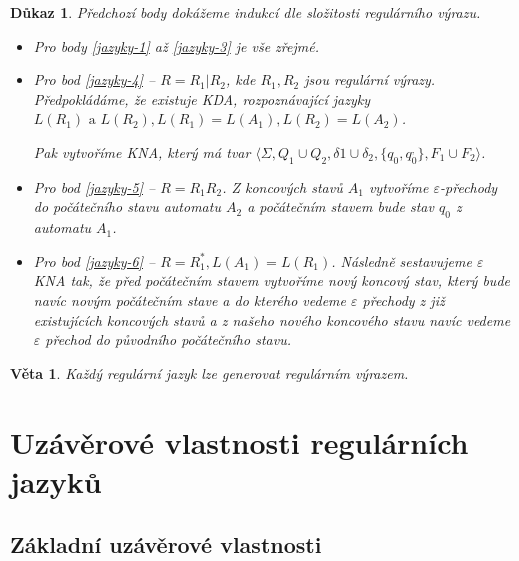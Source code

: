 \documentclass[10pt, a4paper, titlepage]{article}
\theoremstyle{note}
\newtheorem{veta}{\textbf{Věta}}
\newtheorem{dukaz}{\textbf{Důkaz}}
\begin{document}
\begin{dukaz}
Předchozí body dokážeme indukcí dle složitosti regulárního výrazu.

\begin{itemize}
\item
Pro body \ref{jazyky-1} až \ref{jazyky-3} je vše zřejmé.

\item
Pro bod \ref{jazyky-4} -- $R=R_{1}|R_{2}$, kde $R_{1}, R_{2}$ jsou regulární výrazy. Předpokládáme, že existuje KDA, rozpoznávající
jazyky $L(R_{1}) \text{ a } L(R_{2}), L(R_{1}) = L(A_{1}), L(R_{2}) = L(A_{2})$.

Pak vytvoříme KNA, který má tvar $\langle \Sigma, Q_{1} \cup Q_{2}, \delta{1} \cup \delta_{2}, \lbrace q_{0}, q_{0}^{,} \rbrace, F_{1} \cup F_{2} \rangle$.

\item
Pro bod \ref{jazyky-5}  -- $R=R_{1}R_{2}$. Z koncových stavů $A_{1}$ vytvoříme $\varepsilon$-přechody do počátečního stavu automatu $A_{2}$ a počátečním stavem
bude stav $q_{0}$ z automatu $A_{1}$.

\item
Pro bod \ref{jazyky-6} -- $R=R_{1}^{*}, L(A_{1})=L(R_{1})$. Následně sestavujeme $\varepsilon$KNA tak, že před počátečním stavem vytvoříme
nový koncový stav, který bude navíc novým počátečním stave a do kterého vedeme $\varepsilon$ přechody z již existujících koncových stavů a z našeho nového koncového stavu navíc vedeme
$\varepsilon$ přechod do původního počátečního stavu.
\end{itemize}
\end{dukaz}

\begin{veta}
Každý regulární jazyk lze generovat regulárním výrazem.
\end{veta}

\section{Uzávěrové vlastnosti regulárních jazyků}

\subsection{Základní uzávěrové vlastnosti}
\end{document}
